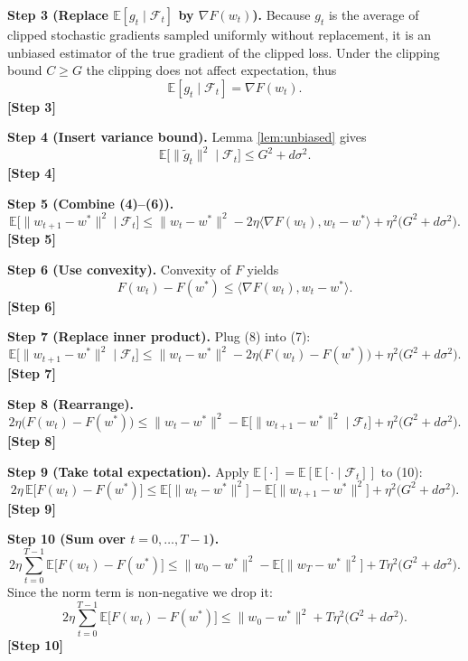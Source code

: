 \documentclass{article}
\begin{document}
\noindent\textbf{Step 3 (Replace $\mathbb{E}[g_{t}\mid\mathcal{F}_{t}]$ by $\nabla F(w_{t})$).}  
Because $g_{t}$ is the average of clipped stochastic gradients sampled uniformly without replacement, it is an unbiased estimator of the true gradient of the clipped loss. Under the clipping bound $C\ge G$ the clipping does not affect expectation, thus
\[
\mathbb{E}[g_{t}\mid\mathcal{F}_{t}]=\nabla F(w_{t}).
\tag{5}
\]
\textbf{[Step 3]}

\noindent\textbf{Step 4 (Insert variance bound).}  
Lemma \ref{lem:unbiased} gives
\[
\mathbb{E}\!\bigl[\|\tilde g_{t}\|^{2}\mid\mathcal{F}_{t}\bigr]\le G^{2}+d\sigma^{2}.
\tag{6}
\]
\textbf{[Step 4]}

\noindent\textbf{Step 5 (Combine (4)–(6)).}
\[
\mathbb{E}\!\bigl[\|w_{t+1}-w^{*}\|^{2}\mid\mathcal{F}_{t}\bigr]
\le \|w_{t}-w^{*}\|^{2}
-2\eta\langle\nabla F(w_{t}),w_{t}-w^{*}\rangle
+\eta^{2}\bigl(G^{2}+d\sigma^{2}\bigr).
\tag{7}
\]
\textbf{[Step 5]}

\noindent\textbf{Step 6 (Use convexity).}  
Convexity of $F$ yields
\[
F(w_{t})-F(w^{*})\le \langle\nabla F(w_{t}),w_{t}-w^{*}\rangle.
\tag{8}
\]
\textbf{[Step 6]}

\noindent\textbf{Step 7 (Replace inner product).}  
Plug (8) into (7):
\[
\mathbb{E}\!\bigl[\|w_{t+1}-w^{*}\|^{2}\mid\mathcal{F}_{t}\bigr]
\le \|w_{t}-w^{*}\|^{2}
-2\eta\bigl(F(w_{t})-F(w^{*})\bigr)
+\eta^{2}\bigl(G^{2}+d\sigma^{2}\bigr).
\tag{9}
\]
\textbf{[Step 7]}

\noindent\textbf{Step 8 (Rearrange).}
\[
2\eta\bigl(F(w_{t})-F(w^{*})\bigr)
\le \|w_{t}-w^{*}\|^{2}
-\mathbb{E}\!\bigl[\|w_{t+1}-w^{*}\|^{2}\mid\mathcal{F}_{t}\bigr]
+\eta^{2}\bigl(G^{2}+d\sigma^{2}\bigr).
\tag{10}
\]
\textbf{[Step 8]}

\noindent\textbf{Step 9 (Take total expectation).}  
Apply $\mathbb{E}[\cdot]=\mathbb{E}[\mathbb{E}[\cdot\mid\mathcal{F}_{t}]]$ to (10):
\[
2\eta\,\mathbb{E}\!\bigl[F(w_{t})-F(w^{*})\bigr]
\le \mathbb{E}\!\bigl[\|w_{t}-w^{*}\|^{2}\bigr]
-\mathbb{E}\!\bigl[\|w_{t+1}-w^{*}\|^{2}\bigr]
+\eta^{2}\bigl(G^{2}+d\sigma^{2}\bigr).
\tag{11}
\]
\textbf{[Step 9]}

\noindent\textbf{Step 10 (Sum over $t=0,\dots,T-1$).}
\[
2\eta\sum_{t=0}^{T-1}\mathbb{E}\!\bigl[F(w_{t})-F(w^{*})\bigr]
\le \|w_{0}-w^{*}\|^{2}
-\mathbb{E}\!\bigl[\|w_{T}-w^{*}\|^{2}\bigr]
+T\eta^{2}\bigl(G^{2}+d\sigma^{2}\bigr).
\tag{12}
\]
Since the norm term is non‑negative we drop it:
\[
2\eta\sum_{t=0}^{T-1}\mathbb{E}\!\bigl[F(w_{t})-F(w^{*})\bigr]
\le \|w_{0}-w^{*}\|^{2}+T\eta^{2}\bigl(G^{2}+d\sigma^{2}\bigr).
\tag{13}
\]
\textbf{[Step 10]}
\end{document}
